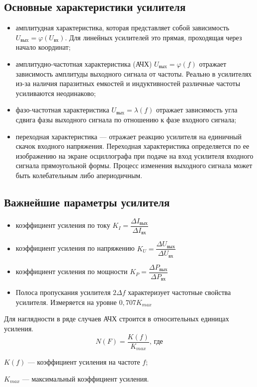 \subsection*{Основные характеристики усилителя}

\begin{itemize}
\item амплитудная характеристика, которая представляет собой зависимость $U_\text{выx} = \varphi(U_\text{вх})$. Для линейных усилителей это прямая, проходящая через начало координат;
\item амплитудно-частотная характеристика (АЧХ) $U_\text{выx} = \varphi(f)$ отражает зависимость амплитуды выходного сигнала от частоты. Реально в усилителях из-за наличия паразитных емкостей и индуктивностей различные частоты усиливаются неодинаково;
\item фазо-частотная характеристика $U_\text{выx} = \lambda(f)$ отражает зависимость угла сдвига фазы выходного сигнала по отношению к фазе входного сигнала;
\item переходная характеристика --- отражает реакцию усилителя на единичный скачок входного напряжения. Переходная характеристика определяется по ее изображению на экране осциллографа при подаче на вход усилителя входного сигнала прямоугольной формы. Процесс изменения выходного сигнала может быть колебательным либо апериодичным.
\end{itemize}

\subsection*{Важнейшие параметры усилителя}

\begin{itemize}
\item коэффициент усиления по току $K_{I} = \dfrac{\Delta I_\text{вых}}{\Delta I_\text{вх}}$
\item коэффициент усиления по напряжению $K_{U} = \dfrac{\Delta U_\text{вых}}{\Delta U_\text{вх}}$
\item коэффициент усиления по мощности $K_{P} = \dfrac{\Delta P_\text{вых}}{\Delta P_\text{вх}}$
\item Полоса пропускания усилителя $2\Delta f$ характеризует частотные свойства усилителя. Измеряется на уровне $0,707 K_{max}$
\end{itemize}

Для наглядности в ряде случаев АЧХ строится в относительных единицах усиления.
\begin{equation}
N(F) = \dfrac{K(f)}{K_{max}}\text{, где}
\end{equation}
\par $K(f)$ --- коэффициент усиления на частоте $f$;
\par $K_{max}$ --- максимальный коэффициент усиления.

